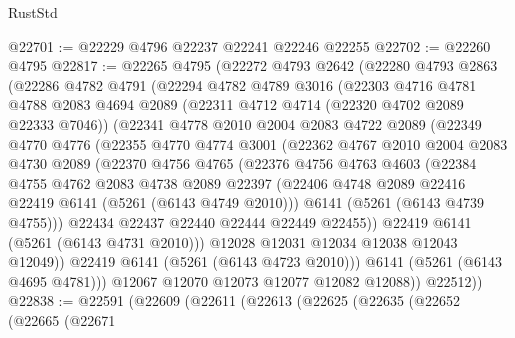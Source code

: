 \begin{lexlean}{RustStd}
\begin{coremodule}
@22701 := @22229 @4796 @22237 @22241 @22246 @22255
@22702 := @22260 @4795
@22817 := @22265
    @4795
    (@22272
      @4793
      @2642
      (@22280
        @4793
        @2863
        (@22286
          @4782
          @4791
          (@22294
            @4782
            @4789
            @3016
            (@22303
              @4716
              @4781
              @4788
              @2083
              @4694
              @2089
              (@22311 @4712 @4714 (@22320 @4702 @2089 @22333 @7046))
              (@22341
                @4778
                @2010
                @2004
                @2083
                @4722
                @2089
                (@22349
                  @4770
                  @4776
                  (@22355
                    @4770
                    @4774
                    @3001
                    (@22362
                      @4767
                      @2010
                      @2004
                      @2083
                      @4730
                      @2089
                      (@22370
                        @4756
                        @4765
                        (@22376
                          @4756
                          @4763
                          @4603
                          (@22384
                            @4755
                            @4762
                            @2083
                            @4738
                            @2089
                            @22397
                            (@22406 @4748 @2089 @22416 @22419 @6141 (@5261 (@6143 @4749 @2010)))
                            @6141
                            (@5261 (@6143 @4739 @4755)))
                          @22434
                          @22437
                          @22440
                          @22444
                          @22449
                          @22455))
                      @22419
                      @6141
                      (@5261 (@6143 @4731 @2010)))
                    @12028
                    @12031
                    @12034
                    @12038
                    @12043
                    @12049))
                @22419
                @6141
                (@5261 (@6143 @4723 @2010)))
              @6141
              (@5261 (@6143 @4695 @4781)))
            @12067
            @12070
            @12073
            @12077
            @12082
            @12088))
        @22512))
@22838 := @22591
    (@22609
      (@22611
        (@22613
          (@22625
            (@22635
              (@22652
                (@22665
                  (@22671

\end{coremodule}
\end{lexlean}
